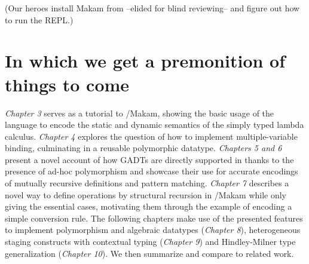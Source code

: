 \begin{scenecomment}
(Our heroes install Makam from --elided for blind reviewing-- and figure out how to run the REPL.)
\end{scenecomment}

\section{In which we get a premonition of things to
come}\label{in-which-we-get-a-premonition-of-things-to-come}

\identNormal

\emph{Chapter 3} serves as a tutorial to \lamprolog/Makam, showing the
basic usage of the language to encode the static and dynamic semantics
of the simply typed lambda calculus. \emph{Chapter 4} explores the
question of how to implement multiple-variable binding, culminating in a
reusable polymorphic datatype. \emph{Chapters 5 and 6} present a novel
account of how GADTs are directly supported in \lamprolog thanks to the
presence of ad-hoc polymorphism and showcase their use for accurate
encodings of mutually recursive definitions and pattern matching.
\emph{Chapter 7} describes a novel way to define operations by
structural recursion in \lamprolog/Makam while only giving the essential
cases, motivating them through the example of encoding a simple
conversion rule. The following chapters make use of the presented
features to implement polymorphism and algebraic datatypes
(\emph{Chapter 8}), heterogeneous staging constructs with contextual
typing (\emph{Chapter 9}) and Hindley-Milner type generalization
(\emph{Chapter 10}). We then summarize and compare to related work.

\identDialog
